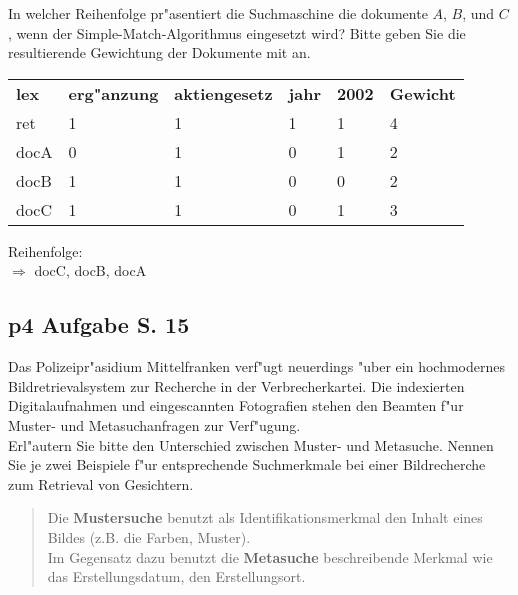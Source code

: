 \noindent
In welcher Reihenfolge pr"asentiert die Suchmaschine die dokumente $A$, $B$, und $C$, wenn der Simple-Match-Algorithmus eingesetzt wird?
Bitte geben Sie die resultierende Gewichtung der Dokumente mit an.\\

\begin{tabular}{ l l l l l l }
    \rowcolor{LightSlateGrey}
    \textbf{lex} & \textbf{erg"anzung} & \textbf{aktiengesetz} & \textbf{jahr} & \textbf{2002} & \textbf{Gewicht}\\
    ret     & 1 & 1 & 1 & 1 & 4\\
    docA    & 0 & 1 & 0 & 1 & 2\\
    docB    & 1 & 1 & 0 & 0 & 2\\
    docC    & 1 & 1 & 0 & 1 & 3\\
\end{tabular}

\bigskip
\noindent
Reihenfolge:\\
$\Rightarrow$ docC, docB, docA\\

\subsection{p4 Aufgabe S. 15}
Das Polizeipr"asidium Mittelfranken verf"ugt neuerdings "uber ein hochmodernes Bildretrievalsystem zur Recherche in der Verbrecherkartei.
Die indexierten Digitalaufnahmen und eingescannten Fotografien stehen den Beamten f"ur Muster- und Metasuchanfragen zur Verf"ugung.\\

\noindent
Erl"autern Sie bitte den Unterschied zwischen Muster- und Metasuche.
Nennen Sie je zwei Beispiele f"ur entsprechende Suchmerkmale bei einer Bildrecherche zum Retrieval von Gesichtern.

\begin{quote}
    Die \textbf{Mustersuche} benutzt als Identifikationsmerkmal den Inhalt eines Bildes (z.B. die Farben, Muster).\\
    Im Gegensatz dazu benutzt die \textbf{Metasuche} beschreibende Merkmal wie das Erstellungsdatum, den Erstellungsort.
\end{quote}



